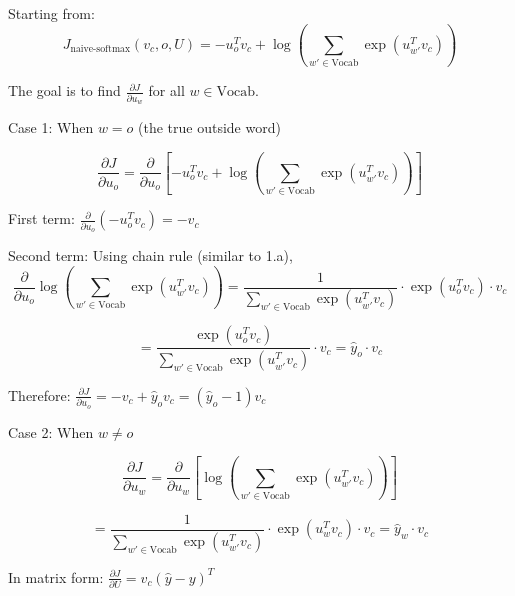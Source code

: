     \begin{answer}
        Starting from:
        $$J_{\text{naive-softmax}}(v_c, o, U) = -u_o^T v_c + \log\left(\sum_{w' \in \text{Vocab}} \exp(u_{w'}^T v_c)\right)$$

        The goal is to find $\frac{\partial J}{\partial u_w}$ for all $w \in \text{Vocab}$.

        Case 1: When $w = o$ (the true outside word)

        $$\frac{\partial J}{\partial u_o} = \frac{\partial}{\partial u_o}\left[-u_o^T v_c + \log\left(\sum_{w' \in \text{Vocab}} \exp(u_{w'}^T v_c)\right)\right]$$

        First term: $\frac{\partial}{\partial u_o}(-u_o^T v_c) = -v_c$

        Second term: Using chain rule (similar to 1.a),
        $$\frac{\partial}{\partial u_o}\log\left(\sum_{w' \in \text{Vocab}} \exp(u_{w'}^T v_c)\right) = \frac{1}{\sum_{w' \in \text{Vocab}} \exp(u_{w'}^T v_c)} \cdot \exp(u_o^T v_c) \cdot v_c$$

        $$= \frac{\exp(u_o^T v_c)}{\sum_{w' \in \text{Vocab}} \exp(u_{w'}^T v_c)} \cdot v_c = \hat{y}_o \cdot v_c$$

        Therefore: $\frac{\partial J}{\partial u_o} = -v_c + \hat{y}_o v_c = (\hat{y}_o - 1)v_c$

        Case 2: When $w \neq o$

        $$\frac{\partial J}{\partial u_w} = \frac{\partial}{\partial u_w}\left[\log\left(\sum_{w' \in \text{Vocab}} \exp(u_{w'}^T v_c)\right)\right]$$

        $$= \frac{1}{\sum_{w' \in \text{Vocab}} \exp(u_{w'}^T v_c)} \cdot \exp(u_w^T v_c) \cdot v_c = \hat{y}_w \cdot v_c$$

        In matrix form: $\frac{\partial J}{\partial U} = v_c(\hat{y} - y)^T$
    \end{answer}
    \clearpage


